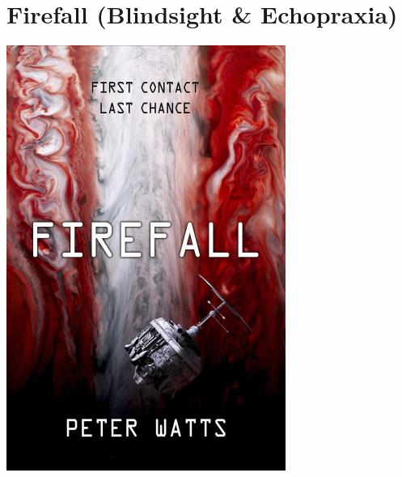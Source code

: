 \documentclass{tufte-handout}
\makeatletter
\newcommand{\varcaption}[2][0pt]{%
  \gsetlength{\@tufte@caption@vertical@offset}{-#1}%
  \gdef\@tufte@stored@varcaption{#2}%
}
\gdef\@tufte@stored@varcaption{} %
\makeatother
\begin{document}
\section*{Firefall (Blindsight \& Echopraxia)}
\begin{marginfigure}[9\baselineskip]
   \includegraphics[width=\linewidth]{images/firefall.jpg}
   \varcaption{\href{https://headofzeus.com/books/9781784080457}{Publisher Link}, \href{https://www.amazon.com/Firefall-Peter-Watts-author/dp/178669610X/}{Amazon Link}}
\end{marginfigure}
\end{document}
